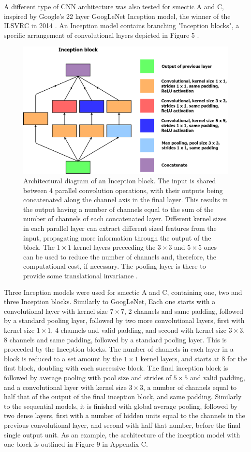 \documentclass[12pt]{article}
\begin{document}
A different type of CNN architecture was also tested for smectic A and C, inspired by Google's 22 layer GoogLeNet Inception model, the winner of the ILSVRC in 2014 \cite{ILSVRC15}. An Inception model contains branching "Inception blocks", a specific arrangement of convolutional layers depicted in Figure 5 \cite{Szegedy2015}.  
\begin{figure}[!ht]
\centering
\includegraphics[width=5in]{images/inception_block.png}
\caption{Architectural diagram of an Inception block. The input is shared between 4 parallel convolution operations, with their outputs being concatenated along the channel axis in the final layer. This results in the output having a number of channels equal to the sum of the number of channels of each concatenated layer. Different kernel sizes in each parallel layer can extract different sized features from the input, propagating more information through the output of the block. The $1 \times 1$ kernel layers preceeding the $3 \times 3$ and $5 \times 5$ ones can be used to reduce the number of channels and, therefore, the computational cost, if necessary. The pooling layer is there to provide some translational invariance \cite{Szegedy2015}.}
\end{figure}
Three Inception models were used for smectic A and C, containing one, two and three Inception blocks. Similarly to GoogLeNet, Each one starts with a convolutional layer with kernel size $7 \times 7$, 2 channels and same padding, followed by a standard pooling layer, followed by two more convolutional layers, first with kernel size $1 \times 1$, 4 channels and valid padding, and second with kernel size $3 \times 3$, 8 channels and same padding, followed by a standard pooling layer. This is proceeded by the Inception blocks. The number of channels in each layer in a block is reduced to a set amount by the $1 \times 1$ kernel layers, and starts at 8 for the first block, doubling with each successive block. The final inception block is followed by average pooling with pool size and strides of $5 \times 5$ and valid padding, and a convolutional layer with kernel size $3 \times 3$, a number of channels equal to half that of the output of the final inception block, and same padding. Similarly to the sequential models, it is finished with global average pooling, followed by two dense layers, first with a number of hidden units equal to the channels in the previous convolutional layer, and second with half that number, before the final single output unit. As an example, the architecture of the inception model with one block is outlined in Figure 9 in Appendix C.
\end{document}
